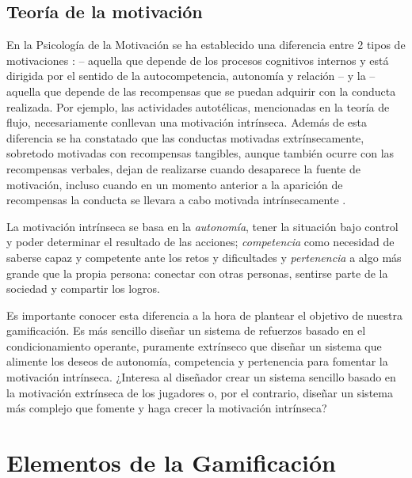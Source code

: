 \subsection{Teoría de la motivación}
\label{SDT}
\label{PosiblesPeligros}
En la Psicología de la Motivación se ha establecido una diferencia entre 2 tipos de motivaciones  \citep{SDT}:   -- aquella que depende de los procesos cognitivos internos y está dirigida por el sentido de la autocompetencia, autonomía y relación -- y la  -- aquella que depende de las recompensas que se puedan adquirir con la conducta realizada.
%
Por ejemplo, las actividades autotélicas, mencionadas en la teoría de flujo, necesariamente conllevan una motivación intrínseca.
%
Además de esta diferencia se ha constatado que las conductas motivadas extrínsecamente, sobretodo motivadas con recompensas tangibles, aunque también ocurre con las recompensas verbales, dejan de realizarse cuando desaparece la fuente de motivación, incluso cuando en un momento anterior a la aparición de recompensas la conducta se llevara a cabo motivada intrínsecamente
%
 \citep{ExtrinsicEatsIntrinsic}.

La motivación intrínseca se basa en la \textit{autonomía}, tener la situación bajo control y poder determinar el resultado de las acciones; \textit{competencia} como necesidad de saberse capaz y competente ante los retos y dificultades y \textit{pertenencia} a algo más grande que la propia persona: conectar con otras personas, sentirse parte de la sociedad y compartir los logros.


Es importante conocer esta diferencia a la hora de plantear el objetivo de nuestra gamificación. 
%
Es más sencillo diseñar un sistema de refuerzos basado en el condicionamiento operante, puramente extrínseco que diseñar un sistema que alimente los deseos de autonomía, competencia y pertenencia para fomentar la motivación intrínseca.
%
¿Interesa al diseñador crear un sistema sencillo basado en la motivación extrínseca de los jugadores o, por el contrario, diseñar un sistema más complejo que fomente y haga crecer la motivación intrínseca?



\section{Elementos de la Gamificación}

